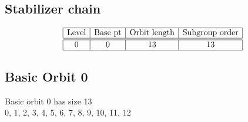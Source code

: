 \subsection*{Stabilizer chain}


$$
\begin{array}{|c|c|c|c|}
\hline
\mbox{Level} & \mbox{Base pt} & \mbox{Orbit length} & \mbox{Subgroup order}\\
\hline
\hline
0 & 0 & 13 & 13\\
\hline
\end{array}
$$

\subsection*{Basic Orbit 0}



Basic orbit 0 has size 13\\
0, 1, 2, 3, 4, 5, 6, 7, 8, 9, 10, 11, 12\\
